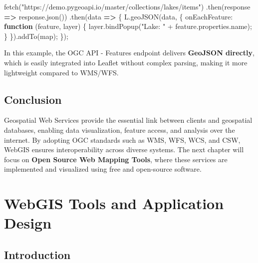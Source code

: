 \documentclass[
  11pt,
  letterpaper,
]{book}
\newenvironment{Shaded}{\begin{snugshade}}{\end{snugshade}}
\newcommand{\AttributeTok}[1]{\textcolor[rgb]{0.40,0.45,0.13}{#1}}
\newcommand{\DataTypeTok}[1]{\textcolor[rgb]{0.68,0.00,0.00}{#1}}
\newcommand{\FunctionTok}[1]{\textcolor[rgb]{0.28,0.35,0.67}{#1}}
\newcommand{\KeywordTok}[1]{\textcolor[rgb]{0.00,0.23,0.31}{\textbf{#1}}}
\newcommand{\NormalTok}[1]{\textcolor[rgb]{0.00,0.23,0.31}{#1}}
\newcommand{\OperatorTok}[1]{\textcolor[rgb]{0.37,0.37,0.37}{#1}}
\newcommand{\StringTok}[1]{\textcolor[rgb]{0.13,0.47,0.30}{#1}}
\begin{document}
\begin{Shaded}
\begin{Highlighting}[]
\FunctionTok{fetch}\NormalTok{(}\StringTok{"https://demo.pygeoapi.io/master/collections/lakes/items"}\NormalTok{)}
  \OperatorTok{.}\FunctionTok{then}\NormalTok{(response }\KeywordTok{=\textgreater{}}\NormalTok{ response}\OperatorTok{.}\FunctionTok{json}\NormalTok{())}
  \OperatorTok{.}\FunctionTok{then}\NormalTok{(data }\KeywordTok{=\textgreater{}}\NormalTok{ \{}
\NormalTok{      L}\OperatorTok{.}\FunctionTok{geoJSON}\NormalTok{(data}\OperatorTok{,}\NormalTok{ \{}
          \DataTypeTok{onEachFeature}\OperatorTok{:} \KeywordTok{function}\NormalTok{ (feature}\OperatorTok{,}\NormalTok{ layer) \{}
\NormalTok{              layer}\OperatorTok{.}\FunctionTok{bindPopup}\NormalTok{(}\StringTok{"Lake: "} \OperatorTok{+}\NormalTok{ feature}\OperatorTok{.}\AttributeTok{properties}\OperatorTok{.}\AttributeTok{name}\NormalTok{)}\OperatorTok{;}
\NormalTok{          \}}
\NormalTok{      \})}\OperatorTok{.}\FunctionTok{addTo}\NormalTok{(map)}\OperatorTok{;}
\NormalTok{  \})}\OperatorTok{;}
\end{Highlighting}
\end{Shaded}

In this example, the OGC API - Features endpoint delivers
\textbf{GeoJSON directly}, which is easily integrated into Leaflet
without complex parsing, making it more lightweight compared to WMS/WFS.

\section{Conclusion}\label{conclusion-8}

Geospatial Web Services provide the essential link between clients and
geospatial databases, enabling data visualization, feature access, and
analysis over the internet. By adopting OGC standards such as WMS, WFS,
WCS, and CSW, WebGIS ensures interoperability across diverse systems.
The next chapter will focus on \textbf{Open Source Web Mapping Tools},
where these services are implemented and visualized using free and
open-source software.

\chapter{WebGIS Tools and Application
Design}\label{webgis-tools-and-application-design}

\section{Introduction}\label{introduction-4}
\end{document}
